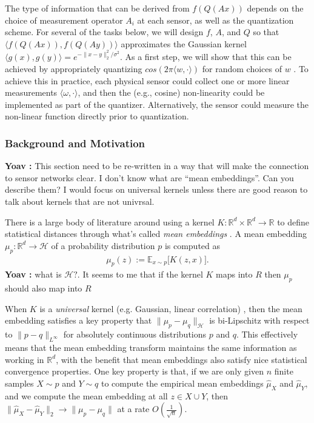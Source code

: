 \documentclass{article}
\newcommand{\comment}[3]{{\color{#1} {\bf #2 :} #3}}
\newcommand{\yoav}[1]{\comment{magenta}{Yoav}{#1}}
\newcommand{\rayan}[1]{\comment{red}{Rayan}{#1}}
\newcommand{\R}{\mathbb{R}}
\begin{document}
The type of information that can be derived from $f(Q(Ax))$ depends on
the choice of measurement operator $A_i$ at each sensor, as well as
the quantization scheme.  For several of the tasks below, we will
design $f$, $A$, and $Q$ so that $\langle f(Q(Ax)), f(Q(Ay))\rangle$
approximates the Gaussian kernel $\langle g(x), g(y) \rangle =
e^{-\|x-y\|_2^2/\sigma^2}$.  As a first step, we will show that this
can be achieved by appropriately quantizing $cos(2\pi \langle w, \cdot
\rangle)$ for random choices of $w$ \cite{rahimi2008random}. To
achieve this in practice, each physical sensor could collect one or
more linear measurements $\langle \omega, \cdot \rangle$, and then the
(e.g., cosine) non-linearity could be implemented as part of the
quantizer. Alternatively, the sensor could measure the non-linear
function directly prior to quantization.

\subsubsection*{Background and Motivation}
\yoav{This section need to be re-written in a way that will make the
  connection to sensor networks clear. I don't know what are ``mean
  embeddings''. Can you describe them? I would focus on universal
  kernels unless there are good reason to talk about kernels that are
  not univrsal.}

There is a large body of literature around using a kernel $K:\mathbb{R}^d\times \mathbb{R}^d \rightarrow \mathbb{R}$ to define statistical distances through what's called \emph{mean embeddings} \cite{muandet2017kernel}.  A mean embedding $\mu_p:\mathbb{R}^d\rightarrow \mathcal{H}$ of a probability distribution $p$ is computed as
\begin{align*}
    \mu_p(z) := \mathbb{E}_{x\sim p} \big[K(z,x)\big].
\end{align*}
\yoav{what is $\mathcal{H}?$. It seems to me that if the kernel $K$
  maps into $R$ then $\mu_p$ should also map into $R$}


When $K$ is a \emph{universal} kernel (e.g. Gaussian, linear correlation) \cite{micchelli2006universal}, then the mean embedding satisfies a key property that $\|\mu_p - \mu_q\|_\mathcal{H}$ %
is bi-Lipschitz with respect to $\|p - q\|_{L^{\infty}}$ for absolutely continuous distributions $p$ and $q$.  This effectively means that the mean embedding transform maintains the same information as working in $\R^d$, with the benefit that mean embeddings also satisfy nice statistical convergence properties.  One key property is that, if we are only given $n$ finite samples $X\sim p$ and $Y\sim q$ to compute the empirical mean embeddings $\widehat{\mu}_X$ and $\widehat{\mu}_Y$, and we compute the mean embedding at all $z\in X\cup Y$, then $\|\widehat{\mu}_X - \widehat{\mu}_Y\|_2 \rightarrow \|\mu_p - \mu_q\|$ at a rate $O\left(\frac{1}{\sqrt{n}}\right)$.
\end{document}
